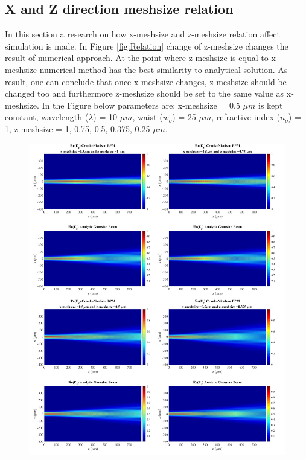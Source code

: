 \documentclass[a4paper]{article}
\begin{document}
	\subsection{X and Z direction meshsize relation}
	In this section a research on how x-meshsize and z-meshsize relation affect simulation is made. In Figure \ref{fig:Relation} change of z-meshsize changes the result of numerical approach. At the point where z-meshsize is equal to x-meshsize numerical method has the best similarity to analytical solution. As result, one can conclude that once x-meshsize changes, z-meshsize should be changed too and furthermore z-meshsize should be set to the same value as x-meshsize. In the Figure below parameters are: x-meshsize  = 0.5 $\mu m$ is kept constant, wavelength ($\lambda$) = 10 $\mu m$, waist ($w_o$) = 25 $\mu m$, refractive index ($n_o$) = 1, z-meshsize = 1, 0.75, 0.5, 0.375, 0.25 $\mu m$.
%	
	\begin{figure}[H]
		\hspace{-22.5mm}
		\includegraphics[width=1.35\textwidth]{change1234.jpg}	
	\end{figure}
	
\end{document}
